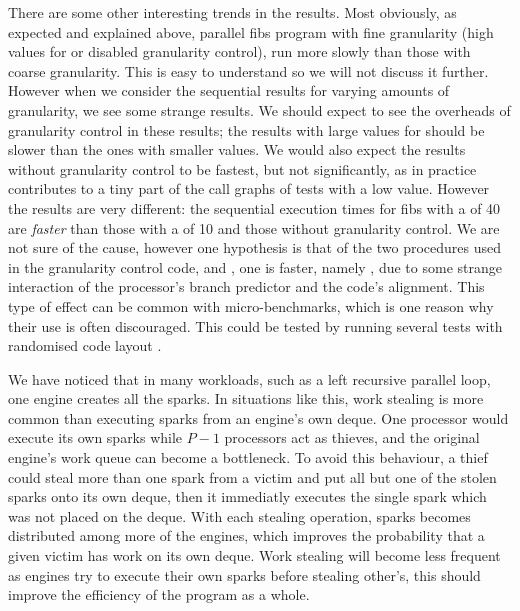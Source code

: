 There are some other interesting trends in the results.
Most obviously,
as expected and explained above,
parallel fibs program with fine granularity
(high values for \Depth or disabled granularity control),
run more slowly than those with coarse granularity.
This is easy to understand so we will not discuss it further.
However
when we consider the sequential results for varying amounts of granularity,
we see some strange results.
We should expect to see the overheads of granularity control in these
results;
the results with large values for \Depth should be slower than the ones with
smaller values.
We would also expect the results without granularity control to be fastest,
but not significantly,
as in practice \fibsgc contributes to a tiny part of the call graphs of tests
with a low \Depth value.
However the results are very different:
the sequential execution times for fibs with a \Depth of 40
are \emph{faster} than those with a \Depth of 10
and those without granularity control.
We are not sure of the cause,
however one hypothesis is that of the two procedures used in the granularity control
code,
\fibsseq and \fibsgc,
one is faster, namely \fibsgc, due to
some strange interaction of the processor's branch predictor and the code's
alignment.
This type of effect can be common with micro-benchmarks,
which is one reason why their use is often discouraged.
This could be tested by running several tests with randomised code layout
\citep{curtsinger:2012:stabilizer}.

We have noticed that in many workloads,
such as a left recursive parallel loop,
one engine creates all the sparks.
In situations like this,
work stealing is more common than executing sparks from an engine's own
deque.
One processor would execute its own sparks while $P - 1$ processors act as
thieves,
and the original engine's work queue can become a bottleneck.
To avoid this behaviour,
a thief could steal more than one spark from a victim and put all but one of
the stolen sparks 
onto its own deque, then it immediatly executes the single spark which was
not placed on the deque.
With each stealing operation, 
sparks becomes distributed among more of the engines,
which improves the probability that a given victim has work on its own deque.
Work stealing will become less frequent as engines try to execute their own
sparks before stealing other's,
this should improve the efficiency of the program as a whole.

